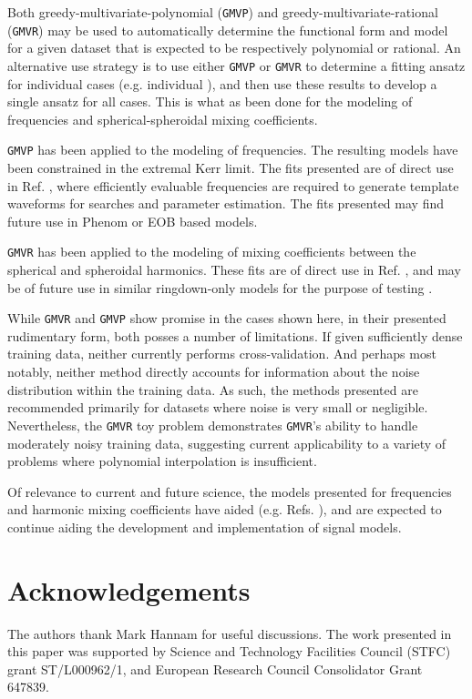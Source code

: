 \documentclass[twocolumn,aps,prd,floatfix,preprintnumbers,a4paper,nofootinbib,
superscriptaddress,10pt]{revtex4-1}
\def\gmvp#1{greedy-multivariate-polynomial#1
  (\texttt{GMVP}#1)\gdef\gmvp{\texttt{GMVP}}}
\def\gmvr#1{greedy-multivariate-rational#1
  (\texttt{GMVR}#1)\gdef\gmvr{\texttt{GMVR}}}
\begin{document}
%
\par Both \gmvp{} and \gmvr{} may be used to automatically determine the functional form and model for a given dataset that is expected to be respectively polynomial or rational.
%
An alternative use strategy is to use either \gmvp{} or \gmvr{} to determine a fitting ansatz for individual cases (e.g. individual ), and then use these results to develop a single ansatz for all cases.
%
This is what as been done for the modeling of \qnm{} frequencies and spherical-spheroidal mixing coefficients.
%
%
\par \gmvp{} has been applied to the modeling of \qnm{} frequencies. The resulting models have been constrained in the extremal Kerr limit.
%
The fits presented are of direct use in Ref. \cite{London:2017bcn}, where efficiently evaluable \qnm{} frequencies are required to generate template waveforms for \gw{} searches and parameter estimation.
%
The fits presented may find future use in Phenom or EOB based \gw{} models.
%
\par \gmvr{} has been applied to the modeling of mixing coefficients between the spherical and spheroidal harmonics.
%
These fits are of direct use in Ref. \cite{Carullo:2018sfu}, and may be of future use in similar ringdown-only models for the purpose of testing \gr{}.
%
\par While \gmvr{} and \gmvp{} show promise in the cases shown here, in their presented rudimentary form, both posses a number of limitations.
%
If given sufficiently dense training data, neither currently performs cross-validation.
%
And perhaps most notably, neither method directly accounts for information about the noise distribution within the training data.
%
As such, the methods presented are recommended primarily for datasets where noise is very small or negligible.
%
Nevertheless, the \gmvr{} toy problem demonstrates \gmvr{}'s ability to handle moderately noisy training data, suggesting current applicability to a variety of problems where polynomial interpolation is insufficient.
%
\par Of relevance to current and future \gw{} science, the models presented for \qnm{} frequencies and harmonic mixing coefficients have aided (e.g. Refs. \cite{Carullo:2018sfu,London:2018gaq,London:2017bcn} ), and are expected to continue aiding the development and implementation of \gw{} signal models.


\section*{Acknowledgements}
%
The authors thank Mark Hannam for useful discussions.
%
The work presented in this paper was supported by Science and Technology Facilities Council (STFC)
grant ST/L000962/1, and European Research Council Consolidator Grant 647839.
%
\end{document}
